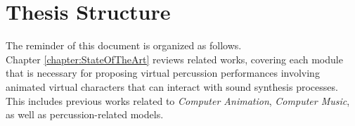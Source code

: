 





	\section{Thesis Structure}

The reminder of this document is organized as follows.\\

Chapter \ref{chapter:StateOfTheArt} reviews related works, covering each module that is necessary for proposing virtual percussion performances involving animated virtual characters that can interact with sound synthesis processes. This includes previous works related to \emph{Computer Animation}, \emph{Computer Music}, as well as percussion-related models.\\

